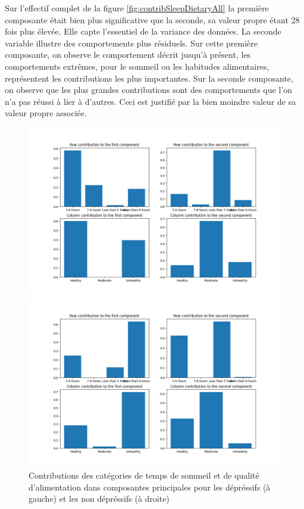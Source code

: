 Sur l’effectif complet de la figure \ref{fig:contribSleepDietaryAll} la première composante était bien plus significative que la seconde, sa valeur propre étant 28 fois plus élevée. Elle capte l’essentiel de la variance des données. La seconde variable illustre des comportements plus résiduels.
Sur cette première composante, on observe le comportement décrit jusqu’à présent, les comportements extrêmes, pour le sommeil ou les habitudes alimentaires, représentent les contributions les plus importantes. Sur la seconde composante, on observe que les plus grandes contributions sont des comportements que l’on n’a pas réussi à lier à d’autres. Ceci est justifié par la bien moindre valeur de sa valeur propre associée.

\begin{figure}[H]
  \centering
  \begin{minipage}{0.5\textwidth}
    \centering
    \includegraphics[width=\linewidth]{Images/Sleep_Dietary_depressive/RowColumnsContributions.png}
  \end{minipage}\hfill
  \begin{minipage}{0.5\textwidth}
    \centering
    \includegraphics[width=\linewidth]{Images/Sleep_Dietary_non_depressive/RowColumnsContributions.png}
  \end{minipage}  
  \caption{Contributions des catégories de temps de sommeil et de qualité d'alimentation dans composantes principales pour les dépréssifs (à gauche) et les non dépréssifs (à droite)}
  \label{fig:contribSleepDietary}
\end{figure}

